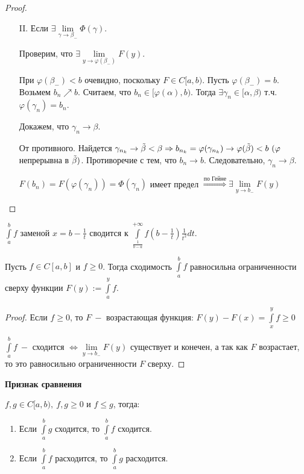 \begin{statement}
\begin{enumerate}
\begin{proof}
\begin{enumerate}
                \item[II.] Если $\exists \lim\limits_{\gamma\rightarrow \beta_-} \Phi(\gamma)$.

                Проверим, что $\exists \lim\limits_{y\rightarrow \varphi(\beta_-)} F(y)$.

                При $\varphi(\beta_-)<b$ очевидно, поскольку $F\in C[a, b)$. Пусть $\varphi(\beta_-)=b$. Возьмем $b_n\nearrow b$. Считаем, что $b_n\in [\varphi(\alpha), b)$. Тогда $\exists \gamma_n\in [\alpha, \beta)$ т.ч. $\varphi(\gamma_n)=b_n$. 
                
                Докажем, что $\gamma_n\rightarrow \beta$. 
                
                От противного. Найдется $\gamma_{n_k}\rightarrow \Tilde{\beta}<\beta\Rightarrow b_{n_k}=\varphi(\gamma_{n_k})\rightarrow \varphi(\Tilde{\beta})<b\ (\varphi$ непрерывна в $\Tilde{\beta})$. Противоречие с тем, что $b_n\rightarrow b$. Следовательно, $\gamma_n\rightarrow \beta$.

                $F(b_n)=F(\varphi(\gamma_n))=\Phi(\gamma_n)$ имеет предел $\overset{\text{по Гейне}}{\Rightarrow}\exists \lim\limits_{y\rightarrow b_-}F(y)$
            \end{enumerate}
        \end{proof}
    \end{enumerate}
\end{statement}

\begin{remark}
    $\int\limits_a^b f$ заменой $x=b-\frac{1}{t}$ сводится к $\int\limits_{\frac{1}{b-a}}^{+\infty}f(b-\frac{1}{t})\frac{1}{t^2}dt$.
\end{remark}

\begin{theorem}
    Пусть $f\in C[a, b]$ и $f\geq 0$. Тогда сходимость $\int\limits_a^b f$ равносильна ограниченности сверху функции $F(y):=\int\limits_a^y f$.
\end{theorem}

\begin{proof}
    Если $f\geq 0$, то $F\ -$ возрастающая функция: $F(y)-F(x)=\int\limits_x^y f\geq 0$

    $\int\limits_a^b f\ -$ сходится $\Leftrightarrow \lim\limits_{y\rightarrow b_-} F(y)$ существует и конечен, а так как $F$ возрастает, то это равносильно ограниченности $F$ сверху.
\end{proof}

\begin{corollary}
    \textbf{Признак сравнения}
    
    $f, g\in C[a, b), \ f, g\geq 0$ и $f\leq g$, тогда:

    \begin{enumerate}
        \item Если $\int\limits_a^b g$ сходится, то $\int\limits_a^b f$ сходится.

        \item Если $\int\limits_a^b f$ расходится, то $\int\limits_a^b g$ расходится.
    \end{enumerate}
\end{corollary}

